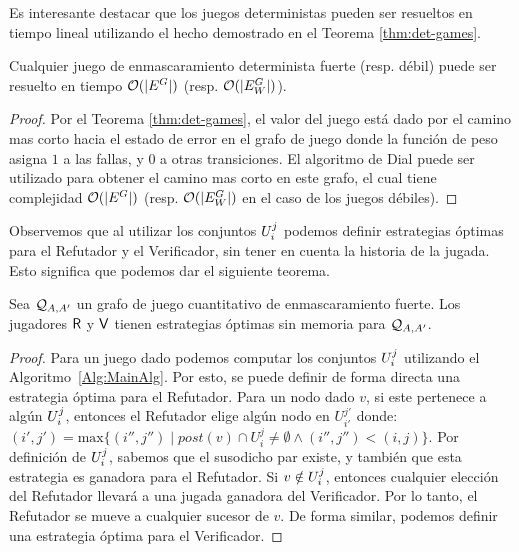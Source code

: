 Es interesante destacar que los juegos deterministas pueden ser resueltos en tiempo lineal utilizando el hecho demostrado en el Teorema \ref{thm:det-games}.
\begin{theorem}\label{thm:deterministic-qgame-complexity} 
Cualquier juego de enmascaramiento determinista fuerte (resp. débil) puede ser resuelto en tiempo $\mathcal{O}(|E^G|)$ (resp. $\mathcal{O}(|E_W^G|)$).
\end{theorem}
\begin{proof} Por el Teorema \ref{thm:det-games}, el valor del juego está dado por el camino mas corto hacia el estado de error en el grafo de juego donde la función de peso asigna $1$ a las fallas, y $0$ a otras transiciones. El algoritmo de Dial \cite{Dial69} puede ser utilizado para obtener el camino mas corto en este grafo, el cual tiene complejidad $\mathcal{O}(|E^G|)$  (resp. $\mathcal{O}(|E^G_W|)$ en el caso de los juegos débiles).
\qedhere
\end{proof} 

Observemos que al utilizar los conjuntos $U^j_i$ podemos definir estrategias óptimas para el Refutador y el Verificador, sin tener en cuenta la historia de la jugada. Esto significa que podemos dar el siguiente teorema.
 
\begin{theorem} \label{thm:memoryless} Sea $\mathcal{Q}_{A, A'}$ un grafo de juego cuantitativo de enmascaramiento fuerte.
  Los jugadores $\mathsf{R}$ y $\mathsf{V}$ tienen estrategias óptimas sin memoria para $\mathcal{Q}_{A, A'}$.
\end{theorem}
\begin{proof} Para un juego dado podemos computar los conjuntos $U^j_i$ utilizando el Algoritmo~\ref{Alg:MainAlg}.
Por esto, se puede definir de forma directa una estrategia óptima para el Refutador. 
Para un nodo dado $v$, si este pertenece a algún $U^j_i$, entonces el Refutador elige algún nodo en $U^{j'}_{i'}$ donde: 
$(i', j') = \text{max}\{(i'', j'') \mid post(v) \cap U^{j}_{i} \neq \emptyset \wedge (i'',j'') < (i,j) \}$. 
Por definición de $U^j_i$, sabemos que el susodicho par existe, y también que esta estrategia es ganadora para el Refutador. Si $v \notin U^j_i$, entonces cualquier elección del Refutador llevará a una jugada ganadora del Verificador. 
Por lo tanto, el Refutador se mueve a cualquier sucesor de $v$.
De forma similar, podemos definir una estrategia óptima para el Verificador.
\qedhere 
\end{proof} \\


